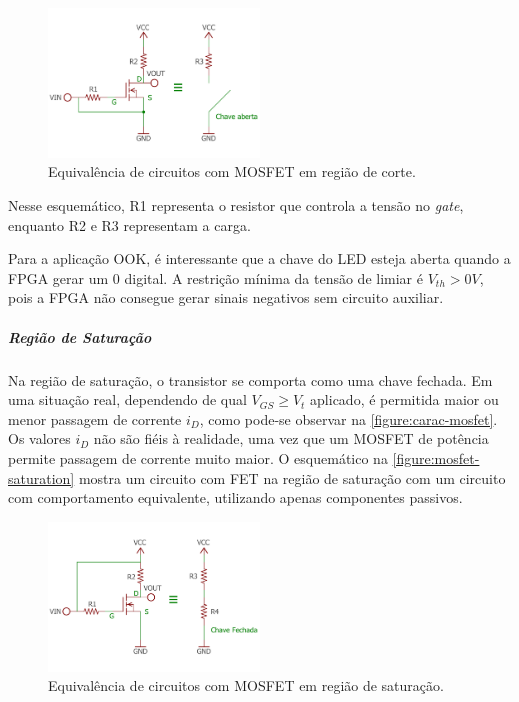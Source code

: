	\begin{figure}[h]
		\caption{\label{figure:mosfet-cutoff}Equivalência de circuitos com MOSFET em região de corte.}
		\centering
		\includegraphics[width=0.5\textwidth, trim={0cm 2cm 0cm 2cm}, clip]{circuits/mosfet_cutoff.pdf}
	\end{figure}

	Nesse esquemático, R1 representa o resistor que controla a tensão no \textit{gate}, enquanto R2 e R3 representam a carga.

	Para a aplicação OOK, é interessante que a chave do LED esteja aberta quando a FPGA gerar um 0 digital. A restrição mínima da tensão de limiar é $V_{th} > 0V$, pois a FPGA não consegue gerar sinais negativos sem circuito auxiliar.

	\subparagraph*{Região de Saturação}

	Na região de saturação, o transistor se comporta como uma chave fechada. Em uma situação real, dependendo de qual $V_{GS} \geq V_{t}$ aplicado, é permitida maior ou menor passagem de corrente $i_{D}$, como pode-se observar na \autoref{figure:carac-mosfet}. Os valores $i_{D}$ não são fiéis à realidade, uma vez que um MOSFET de potência permite passagem de corrente muito maior. O esquemático na \autoref{figure:mosfet-saturation} mostra um circuito com FET na região de saturação com um circuito com comportamento equivalente, utilizando apenas componentes passivos.

	\begin{figure}[htb]
		\caption{\label{figure:mosfet-saturation}Equivalência de circuitos com MOSFET em região de saturação.}
		\centering
		\includegraphics[width=0.5\textwidth, trim={0cm 2cm 0cm 2cm}, clip]{circuits/mosfet_saturation.pdf}
	\end{figure}

